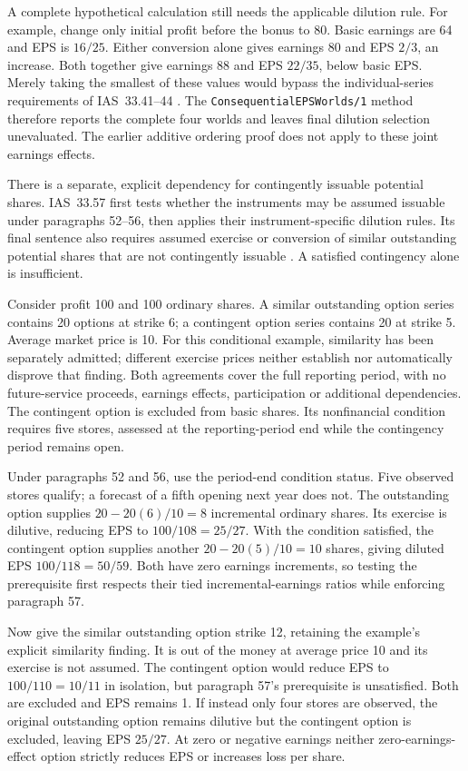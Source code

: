 A complete hypothetical calculation still needs the applicable dilution rule.
For example, change only initial profit before the bonus to 80. Basic earnings
are 64 and EPS is \(16/25\). Either conversion alone gives earnings 80 and
EPS \(2/3\), an increase. Both together give earnings 88 and EPS \(22/35\),
below basic EPS. Merely taking the smallest of these values would bypass the
individual-series requirements of IAS~33.41--44
\citep[IAS~33.41--44]{eu20231803}. The
\texttt{ConsequentialEPSWorlds/1} method therefore reports the complete four
worlds and leaves final dilution selection unevaluated. The earlier additive
ordering proof does not apply to these joint earnings effects.

There is a separate, explicit dependency for contingently issuable potential
shares. IAS~33.57 first tests whether the instruments may be assumed issuable
under paragraphs 52--56, then applies their instrument-specific dilution rules.
Its final sentence also requires assumed exercise or conversion of similar
outstanding potential shares that are not contingently issuable
\citep[IAS~33.52--57]{eu20231803}. A satisfied contingency alone is insufficient.

Consider profit 100 and 100 ordinary shares. A similar outstanding option
series contains 20 options at strike 6; a contingent option series contains
20 at strike 5. Average market price is 10. For this conditional example,
similarity has been separately admitted; different exercise prices neither
establish nor automatically disprove that finding. Both agreements cover the
full reporting period, with no future-service proceeds, earnings effects,
participation or additional dependencies. The contingent option is excluded
from basic shares. Its nonfinancial condition requires five stores, assessed
at the reporting-period end while the contingency period remains open.

Under paragraphs 52 and 56, use the period-end condition status. Five observed
stores qualify; a forecast of a fifth opening next year does not. The
outstanding option supplies \(20-20(6)/10=8\) incremental ordinary shares.
Its exercise is dilutive, reducing EPS to \(100/108=25/27\). With the
condition satisfied, the contingent option supplies another
\(20-20(5)/10=10\) shares, giving diluted EPS \(100/118=50/59\).
Both have zero earnings increments, so testing the prerequisite first respects
their tied incremental-earnings ratios while enforcing paragraph 57.

Now give the similar outstanding option strike 12, retaining the example's
explicit similarity finding. It is out of the money at average price 10 and
its exercise is not assumed. The contingent option would reduce EPS to
\(100/110=10/11\) in isolation, but paragraph 57's prerequisite is unsatisfied.
Both are excluded and EPS remains 1. If instead only four stores are observed,
the original outstanding option remains dilutive but the contingent option is
excluded, leaving EPS \(25/27\). At zero or negative earnings neither
zero-earnings-effect option strictly reduces EPS or increases loss per share.

